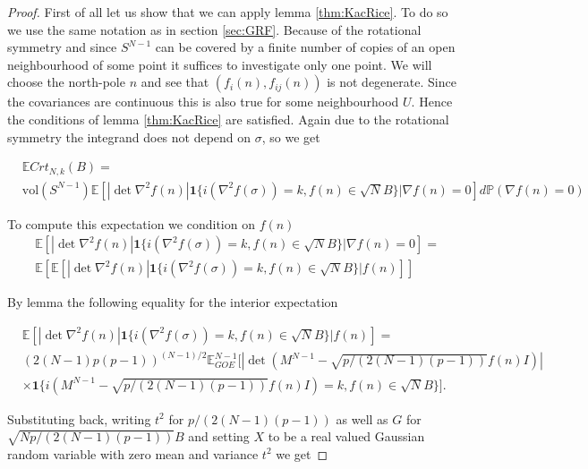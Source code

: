 \begin{proof}

First of all let us show that we can apply lemma \ref{thm:KacRice}. To do so we use the same notation as in section \ref{sec:GRF}. Because of the rotational symmetry and since $S^{N-1}$ can be covered by a finite number of copies of an open neighbourhood of some point it suffices to investigate only one point. We will choose the north-pole $n$ and see that $(f_i(n),f_{ij}(n))$ is not degenerate. Since the covariances are continuous this is also true for some neighbourhood $U$. Hence the conditions of lemma \ref{thm:KacRice} are satisfied. Again due to the rotational symmetry the integrand does not depend on $\sigma$, so we get

\begin{align*}
	&\mathbb E Crt_{N,k}(B)=\\
	&\text{vol}(S^{N-1})\mathbb E[|\det\nabla^2 f(n)|\mathbf 1\{i(\nabla^2 f(\sigma))=k, f(n)\in\sqrt NB\}|\nabla f(n)=0]d\mathbb P(\nabla f(n)=0)
\end{align*}

To compute this expectation we condition on $f(n)$
\begin{align*}
	&\mathbb E[|\det\nabla^2 f(n)|\mathbf 1\{i(\nabla^2 f(\sigma))=k, f(n)\in\sqrt NB\}|\nabla f(n)=0]=\\
	&\mathbb E\left[\mathbb E[|\det\nabla^2 f(n)|\mathbf 1\{i(\nabla^2 f(\sigma))=k,f(n)\in\sqrt NB\}|f(n)]\right]
\end{align*}

By lemma the following equality for the interior expectation

\begin{align*}
	&\mathbb E[|\det\nabla^2 f(n)|\mathbf 1\{i(\nabla^2 f(\sigma))=k,f(n)\in\sqrt NB\}|f(n)]=\\
	&(2(N-1)p(p-1))^{(N-1)/2}\mathbb E_{GOE}^{N-1}\Big[|\det(M^{N-1}-\sqrt{p/(2(N-1)(p-1))}f(n)I)|\\&\times\mathbf 1\{i(M^{N-1}-\sqrt{p/(2(N-1)(p-1))}f(n)I)=k,f(n)\in\sqrt NB\}\Big].
\end{align*}

Substituting back, writing $t^2$ for $p/(2(N-1)(p-1))$ as well as $G$ for $\sqrt{Np/(2(N-1)(p-1))}B$ and setting $X$ to be a real valued Gaussian random variable with zero mean and variance $t^2$ we get 


\end{proof}
